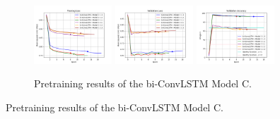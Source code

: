 \documentclass{beamer}
\begin{document}
\begin{frame}
\begin{figure}[htbp]
        \begin{subfigure}[b]{\textwidth}
            \centering
            \includegraphics[width=0.32\textwidth]{../report/entities/pretrained/unipose2/train_losses.png}
            \includegraphics[width=0.32\textwidth]{../report/entities/pretrained/unipose2/val_losses.png}
            \includegraphics[width=0.32\textwidth]{../report/entities/pretrained/unipose2/val_accs.png}
            \caption{Pretraining results of the bi-ConvLSTM Model C.}
        \end{subfigure}
        \hfill
    \end{figure}
\end{frame}
\end{document}
